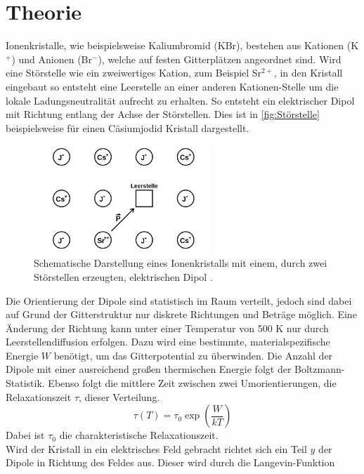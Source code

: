 \section{Theorie}
\label{sec:Theorie}
Ionenkristalle, wie beispielsweise Kaliumbromid (KBr), bestehen aus Kationen (K$^{+}$) und Anionen (Br$^{-}$), welche
auf festen Gitterplätzen angeordnet sind.
Wird eine Störstelle wie ein zweiwertiges Kation, zum Beispiel Sr$^{2+}$, in den Kristall eingebaut so
entsteht eine Leerstelle an einer anderen Kationen-Stelle um die lokale Ladungsneutralität aufrecht zu erhalten.
So entsteht ein elektrischer Dipol mit Richtung entlang der Achse der Störstellen. Dies ist in \autoref{fig:Störstelle}
beispielsweise für einen Cäsiumjodid Kristall dargestellt.
\begin{figure}[H]
  \centering
  \includegraphics[width=0.6\textwidth]{pics/Stoerstelle.png}
  \caption{Schematische Darstellung eines Ionenkristalls mit einem, durch
  zwei Störstellen erzeugten, elektrischen Dipol \cite{Anleitung}.}
  \label{fig:Störstelle}
\end{figure}
Die Orientierung der Dipole sind statistisch im Raum verteilt, jedoch sind dabei auf Grund der Gitterstruktur
nur diskrete Richtungen und Beträge möglich. Eine Änderung der Richtung
kann unter einer Temperatur von 500 K nur durch Leerstellendiffusion erfolgen.
Dazu wird eine bestimmte, materialspezifische Energie $W$ benötigt, um das Gitterpotential zu überwinden.
Die Anzahl der Dipole mit einer ausreichend großen thermischen Energie folgt der Boltzmann-Statistik.
Ebenso folgt die mittlere Zeit zwischen zwei Umorientierungen, die Relaxationszeit $\tau$, dieser Verteilung.
\begin{equation}
  \tau(T) = \tau_0 \exp{\left(\frac{W}{kT}\right)}
  \label{eq:Relaxationszeit}
\end{equation}
Dabei ist $\tau_0$ die charakteristische Relaxationszeit.\\
Wird der Kristall in ein elektrisches Feld gebracht richtet sich ein Teil $y$ der Dipole in Richtung
des Feldes aus. Dieser wird durch die Langevin-Funktion

